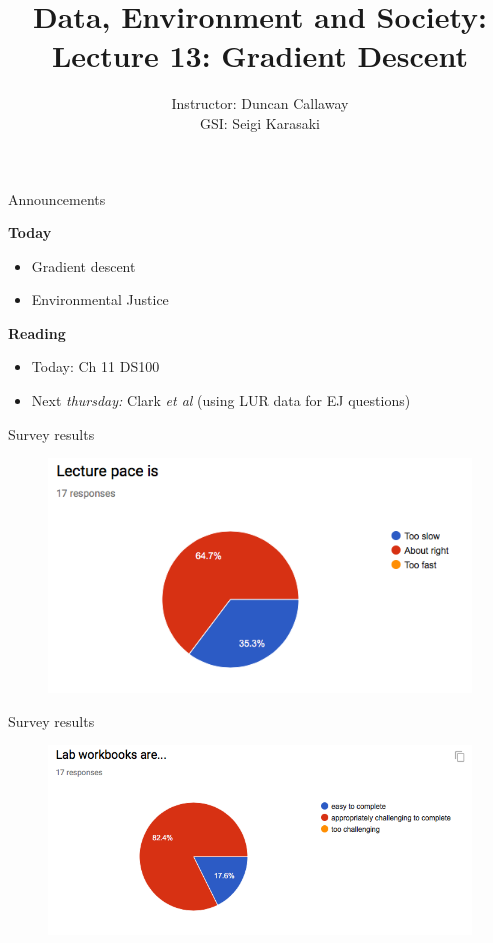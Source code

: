 \documentclass[aspectratio=169]{beamer}
\title[Lecture 13: Gradient Descent] %
{Data, Environment and Society: \\{Lecture 13: Gradient Descent}}
\author[ER190C: Data, Environment and Society] 
{Instructor: Duncan Callaway\\
GSI: Seigi Karasaki}
\institute[UC Berkeley] %
 {\small{ \bf October 4, 2018}}
\date[October 4, 2018]
\begin{document}
\begin{frame}
  \titlepage
\end{frame}

\begin{frame}{Announcements}

\textbf{Today}
\begin{itemize}
\item Gradient descent
\item Environmental Justice
\end{itemize}

\textbf{Reading}
\begin{itemize}
\item Today: Ch 11 DS100
\item Next \textit{thursday:} Clark \textit{et al} (using LUR data for EJ questions)
\end{itemize}
\end{frame}


\begin{frame}{Survey results}
\begin{figure}
\includegraphics[width=\textwidth]{survey_pace}
\caption*{}
\end{figure}
\end{frame}

\begin{frame}{Survey results}
\begin{figure}
\includegraphics[width=\textwidth]{survey_lab_notebooks}
\caption*{}
\end{figure}
\end{frame}
\end{document}
